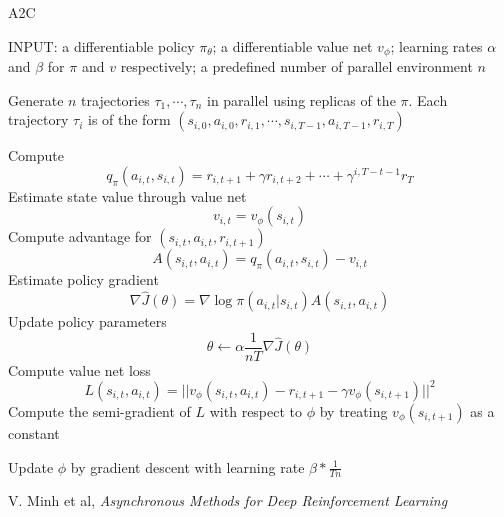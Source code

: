 \documentclass{article}
\begin{document}
\begin{algorithm}[H]
  \caption{A2C}
\end{algorithm}
\begin{algorithmic}[1]
  \STATE INPUT: a differentiable policy $\pi_{\theta}$; 
  a differentiable value net $v_{\phi}$; learning rates
  $\alpha$ and $\beta$ for $\pi$ and $v$ respectively;
  a predefined number of parallel environment $n$
  
  \REPEAT
  \STATE Generate $n$ trajectories $\tau_1, \cdots, \tau_n$ in parallel 
  using replicas of the $\pi$. Each trajectory $\tau_i$ is of the form 
  $(s_{i,0}, a_{i,0}, r_{i,1}, \cdots, s_{i,T-1}, a_{i,T-1}, r_{i,T})$

      \STATE Compute
      \[
        q_{\pi}(a_{i,t}, s_{i,t})  = r_{i,t+1}+\gamma r_{i,t+2} + \cdots + 
          \gamma^{i,T-t-1}r_T
      \]
      \STATE Estimate state value through value net
      \[
        v_{i,t} = v_{\phi}(s_{i,t})
      \]
      \STATE Compute advantage for $(s_{i,t}, a_{i,t}, r_{i,t+1})$
      \[
         A(s_{i,t}, a_{i,t}) = q_{\pi}(a_{i,t}, s_{i,t}) - v_{i,t}
      \]
      \STATE Estimate policy gradient
      \[
         \nabla \hat J(\theta) = \nabla \log\pi(a_{i,t}|s_{i,t})A(s_{i,t}, 
          a_{i,t})
        \]
      \STATE Update policy parameters
      \[
         \theta \leftarrow \alpha\frac{1}{nT}\nabla \hat J(\theta)
       \]
      \STATE Compute value net loss
      \[
         L(s_{i,t}, a_{i,t}) = ||v_{\phi}(s_{i,t},a_{i,t}) - r_{i,t+1} - 
          \gamma v_{\phi}(s_{i,t+1}) ||^2
      \]
      \STATE Compute the semi-gradient of $L$ with respect to $\phi$ by 
      treating $v_{\phi}(s_{i,t+1})$ as a constant
      
      \STATE Update $\phi$ by gradient descent with learning rate 
      $\beta * \frac{1}{Tn}$
    \ENDFOR
  \ENDFOR
\end{algorithmic}

\begin{thebibliography}{9}
  V. Minh et al, \emph{Asynchronous Methods for Deep Reinforcement Learning}

\end{thebibliography}
\end{document}
